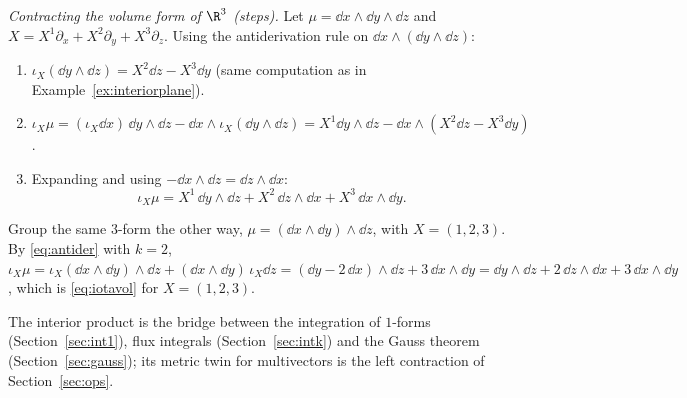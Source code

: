 \emph{Contracting the volume form of $\R^3$ (steps).} Let $\mu=\dd x\wedge\dd y\wedge\dd z$ and $X=X^1\partial_x+X^2\partial_y+X^3\partial_z$. Using the antiderivation rule on $\dd x\wedge(\dd y\wedge\dd z)$:
\begin{enumerate}
\item $\iota_X(\dd y\wedge\dd z)=X^2\dd z-X^3\dd y$ (same computation as in Example~\ref{ex:interiorplane}).
\item $\iota_X\mu=(\iota_X\dd x)\,\dd y\wedge\dd z-\dd x\wedge\iota_X(\dd y\wedge\dd z)=X^1\dd y\wedge\dd z-\dd x\wedge(X^2\dd z-X^3\dd y)$.
\item Expanding and using $-\dd x\wedge\dd z=\dd z\wedge\dd x$:
\begin{equation}\label{eq:iotavol}
\iota_X\mu=X^1\,\dd y\wedge\dd z+X^2\,\dd z\wedge\dd x+X^3\,\dd x\wedge\dd y .
\end{equation}
\end{enumerate}
\numcheck Group the same $3$-form the other way, $\mu=(\dd x\wedge\dd y)\wedge\dd z$, with $X=(1,2,3)$. By \eqref{eq:antider} with $k=2$,
$\iota_X\mu=\iota_X(\dd x\wedge\dd y)\wedge\dd z+(\dd x\wedge\dd y)\,\iota_X\dd z=(\dd y-2\,\dd x)\wedge\dd z+3\,\dd x\wedge\dd y
=\dd y\wedge\dd z+2\,\dd z\wedge\dd x+3\,\dd x\wedge\dd y$, which is \eqref{eq:iotavol} for $X=(1,2,3)$. \checkmark

The interior product is the bridge between the integration of $1$-forms (Section~\ref{sec:int1}), flux integrals (Section~\ref{sec:intk}) and the Gauss theorem (Section~\ref{sec:gauss}); its metric twin for multivectors is the left contraction of Section~\ref{sec:ops}.
